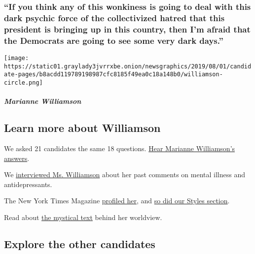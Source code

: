 \hypertarget{if-you-think-any-of-this-wonkiness-is-going-to-deal-with-this-dark-psychic-force-of-the-collectivized-hatred-that-this-president-is-bringing-up-in-this-country-then-im-afraid-that-the-democrats-are-going-to-see-some-very-dark-days}{%
\subsubsection{``If you think any of this wonkiness is going to deal
with this dark psychic force of the collectivized hatred that this
president is bringing up in this country, then I'm afraid that the
Democrats are going to see some very dark
days.''}\label{if-you-think-any-of-this-wonkiness-is-going-to-deal-with-this-dark-psychic-force-of-the-collectivized-hatred-that-this-president-is-bringing-up-in-this-country-then-im-afraid-that-the-democrats-are-going-to-see-some-very-dark-days}}

\texttt{[image: https://static01.graylady3jvrrxbe.onion/newsgraphics/2019/08/01/candidate-pages/b8acdd119789198987cfc8185f49ea0c18a148b0/williamson-circle.png]}

\hypertarget{marianne-williamson-1}{%
\subparagraph{Marianne Williamson}\label{marianne-williamson-1}}

\hypertarget{learn-more-about-williamson}{%
\subsection{Learn more about
Williamson}\label{learn-more-about-williamson}}

We asked 21 candidates the same 18 questions.
\href{https://www.nytimes3xbfgragh.onion/interactive/2019/us/politics/marianne-williamson-2020-campaign.html}{Hear
Marianne Williamson's answers}.

We
\href{https://www.nytimes3xbfgragh.onion/2019/07/27/us/politics/marianne-williamson-mental-health.html}{interviewed
Ms. Williamson} about her past comments on mental illness and
antidepressants.

The New York Times Magazine
\href{https://www.nytimes3xbfgragh.onion/2019/09/03/magazine/marianne-williamson-2020.html}{profiled
her}, and
\href{https://www.nytimes3xbfgragh.onion/2019/06/28/style/marianne-williamson-debate-president.html}{so
did our Styles section}.

Read about
\href{https://www.nytimes3xbfgragh.onion/2019/07/05/nyregion/marianne-williamson.html}{the
mystical text} behind her worldview.

\hypertarget{explore-the-other-candidates}{%
\subsection{Explore the other
candidates}\label{explore-the-other-candidates}}

